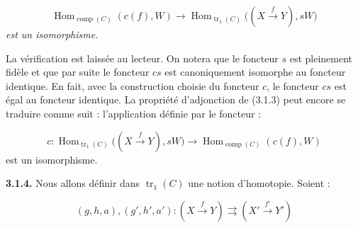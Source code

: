 \begin{equation*}
  \operatorname{Hom}_{\operatorname{comp}(C)}(c(f),W)
  \longrightarrow
  \operatorname{Hom}_{\operatorname{tr}_1(C)}
    \bigl((X\xrightarrow{f}Y),sW\bigr)
\end{equation*}
\emph{est un isomorphisme.}

La vérification est laissée au lecteur.
On notera que le foncteur $s$ est pleinement fidèle et que par suite le
foncteur $cs$ est canoniquement isomorphe au foncteur identique.
En fait, avec la construction choisie du foncteur $c$, le foncteur $cs$ est
égal au foncteur identique.
La propriété d'adjonction de (3.1.3) peut encore se traduire comme suit :
l'application définie par le foncteur :

\begin{equation*}
  c\colon
  \operatorname{Hom}_{\operatorname{tr}_1(C)}
    \bigl((X\xrightarrow{f}Y),sW\bigr)
  \longrightarrow
  \operatorname{Hom}_{\operatorname{comp}(C)}(c(f),W)
\end{equation*}
est un isomorphisme.

\noindent\textbf{3.1.4.}\quad
Nous allons définir dans $\operatorname{tr}_1(C)$ une notion d'homotopie.
Soient :

\begin{equation*}
  (g,h,a),(g',h',a')\colon
  (X\xrightarrow{f}Y)
  \rightrightarrows
  (X'\xrightarrow{f'}Y')
\end{equation*}
